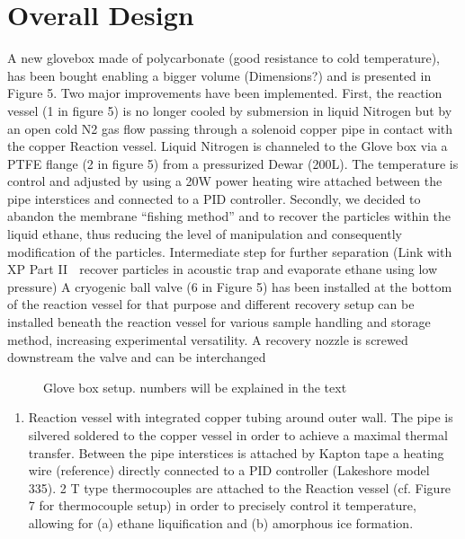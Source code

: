 \documentclass[letterpaper,10pt,english]{jupyterBook}
\begin{document}
\section{Overall Design}
\label{\detokenize{Chapter7/Chapter7:overall-design}}
\sphinxAtStartPar
A new glovebox made of polycarbonate (good resistance to cold temperature), has been bought enabling a bigger volume (Dimensions?) and is presented in Figure 5. Two major improvements have been implemented.
First, the reaction vessel (1 in figure 5) is no longer cooled by submersion in liquid Nitrogen but by an open cold N2 gas flow passing through a solenoid copper pipe in contact with the copper Reaction vessel. Liquid Nitrogen is channeled to the Glove box via a PTFE flange (2 in figure 5) from a pressurized Dewar (200L). The temperature is control and adjusted by using a 20W power heating wire attached between the pipe interstices and connected to a PID controller.
Secondly, we decided to abandon the membrane “fishing method” and to recover the particles within the liquid ethane, thus reducing the level of manipulation and consequently modification of the particles.
Intermediate step for further separation (Link with XP Part II  recover particles in acoustic trap and evaporate ethane using low pressure)
A cryogenic ball valve (6 in Figure 5) has been installed at the bottom of the reaction vessel for that purpose and different recovery setup can be installed beneath the reaction vessel for various sample handling and storage method, increasing experimental versatility. A recovery nozzle is screwed downstream the valve and can be interchanged

\begin{figure}[htbp]
\centering
\capstart

\noindent{}
\caption{Glove box setup. numbers will be explained in the text}\label{\detokenize{Chapter7/Chapter7:directive-fig}}\end{figure}
\begin{enumerate}
%
\item {} 
\sphinxAtStartPar
Reaction vessel with integrated copper tubing around outer wall. The pipe is silvered soldered to the copper vessel in order to achieve a maximal thermal transfer. Between the pipe interstices is attached by Kapton tape a heating wire (reference) directly connected to a PID controller (Lakeshore model 335). 2 T type thermocouples are attached to the Reaction vessel (cf. Figure 7 for thermocouple setup) in order to precisely control it temperature, allowing for (a) ethane liquification and (b) amorphous ice formation.

\end{enumerate}
\end{document}
